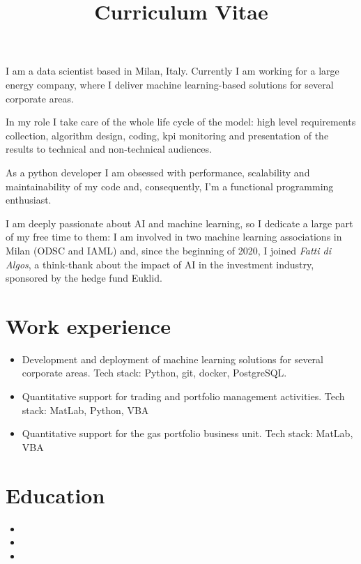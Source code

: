 \documentclass[11pt,a4paper,sans]{moderncv}        %
\title{Curriculum Vitae}                               %
\begin{document}
\makecvtitle
\small{I am a data scientist based in Milan, Italy. Currently I am working for a large energy company, where I deliver machine learning-based solutions for several corporate areas.

In my role I take care of the whole life cycle of the model: high level requirements collection, algorithm design, coding, kpi monitoring and presentation of the results to technical and non-technical audiences. 

As a python developer I am obsessed with performance, scalability and maintainability of my code and, consequently, I'm a functional programming enthusiast. 

I am deeply passionate about AI and machine learning, so I dedicate a large part of my free time to them: I am involved in two machine learning associations in Milan (ODSC and IAML) and, since the beginning of 2020, I joined \emph{Fatti di Algos}, a think-thank about the impact of AI in the investment industry, sponsored by the hedge fund Euklid.}

\section{Work experience}

\begin{itemize}
\item{
Development and deployment of machine learning solutions for several corporate areas. Tech stack: Python, git, docker, PostgreSQL.
}
\item{
Quantitative support for trading and portfolio management activities. Tech stack: MatLab, Python, VBA
}
\item{
Quantitative support for the gas portfolio business unit. Tech stack: MatLab, VBA}
\end{itemize}

\section{Education}
\begin{itemize}
\item{}
\item{}
\item{}
\end{itemize}
\end{document}
